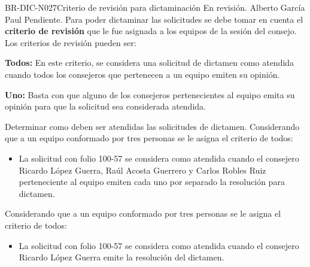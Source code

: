 \begin{BusinessRule}{BR-DIC-N027}{Criterio de revisión para dictaminación}{\bcCondition} %
{\btEnabler}     %
{\blControlling}     %
	\BRItem[Estado] En revisión.
	 Alberto García Paul	
	 Pendiente.
	\BRItem[Descripción] Para poder dictaminar las solicitudes se debe tomar en cuenta el \textbf{criterio de revisión} que le fue asignada a los equipos de la sesión del consejo. Los criterios de revisión pueden ser: \\
	\begin{Citemize}
		\item \textbf{Todos: }En este criterio, se considera una solicitud de dictamen como atendida cuando todos los consejeros que pertenecen a un equipo emiten su opinión. 
		\item \textbf{Uno: }Basta con que alguno de los consejeros pertenecientes al equipo emita su opinión para que la solicitud sea considerada atendida.
	\end{Citemize}
	\BRItem[Sentencia] \cdtEmpty
	
%	 
	\BRItem[Motivación] Determinar como deben ser atendidas las solicitudes de dictamen. 
	 Considerando que a un equipo conformado por tres personas se le asigna el criterio de todos:
	\begin{itemize}
		\item La solicitud con folio 100-57 se considera como atendida cuando el consejero Ricardo López Guerra, Raúl Acosta Guerrero y Carlos Robles Ruiz perteneciente al equipo emiten cada uno por separado la resolución para dictamen.
	\end{itemize} 
	
	 Considerando que a un equipo conformado por tres personas se le asigna el criterio de todos:
	\begin{itemize}
		\item La solicitud con folio 100-57 se considera como atendida cuando el consejero Ricardo López Guerra emite la resolución del dictamen.
	\end{itemize}
	
\end{BusinessRule}

